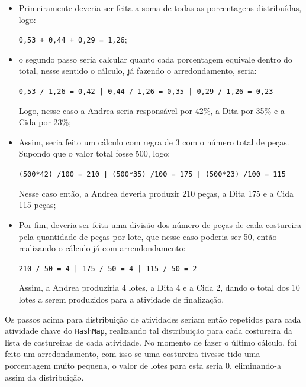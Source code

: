 \begin{itemize}
	\item Primeiramente deveria ser feita a soma de todas as porcentagens distribuídas, logo: 
	\par \texttt{0,53 + 0,44 + 0,29 = 1,26};
	
	\item o segundo passo seria calcular quanto cada porcentagem equivale dentro do total, nesse 
	sentido o cálculo, já fazendo o arredondamento, seria: 
	\par \texttt{0,53 / 1,26 = 0,42 | 0,44 / 1,26 = 0,35 | 0,29 / 1,26 = 0,23}
	\par Logo, nesse caso a Andrea seria responsável por 42\%, a Dita por 35\% e a Cida por 23\%;
	
	\item Assim, seria feito um cálculo com regra de 3 com o número total de peças. Supondo que o 
	 valor total fosse 500, logo:
	
	\par \texttt{(500*42) /100 = 210 | (500*35) /100 = 175 | (500*23) /100 =
	115}
	
	\par Nesse caso então, a Andrea deveria produzir 210 peças, a Dita 175 e a Cida 115 peças;
	
	\item Por fim, deveria ser feita uma divisão dos número de peças de cada costureira pela quantidade
     de peças por lote, que nesse caso poderia ser 50, então realizando o cálculo já com arrendondamento:
     \par \texttt{210 / 50 = 4 | 175 / 50 = 4 | 115 / 50 = 2}
     
     \par Assim, a Andrea produziria 4 lotes, a Dita 4 e a Cida 2, dando o total
     dos 10 lotes a serem produzidos para a atividade de finalização.
	
\end{itemize}
 
 \par Os passos acima para distribuição de atividades seriam então repetidos
 para cada atividade chave do \texttt{HashMap}, realizando tal distribuição para cada costureira da lista de 
 costureiras de cada atividade. No momento de fazer o último cálculo, foi feito
 um arredondamento, com isso se uma costureira tivesse tido uma porcentagem muito pequena, o valor de lotes para
 esta seria 0, eliminando-a assim da distribuição.
 
